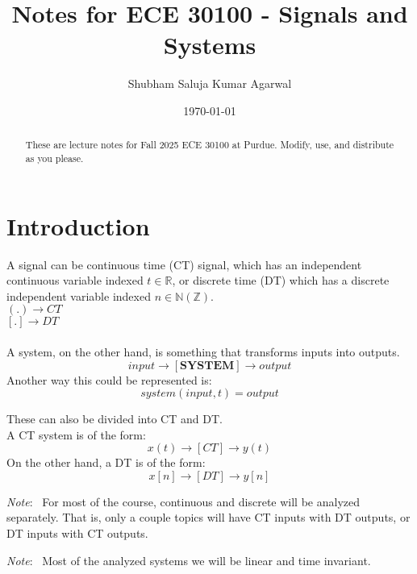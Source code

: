 \documentclass[nobib]{tufte-handout}
\title{Notes for ECE 30100 - Signals and Systems}
\author[Shubham Saluja Kumar Agarwal]{Shubham Saluja Kumar Agarwal}
\date{\today}  %
\newcommand{\note}[1]{
        \begin{notebox}
        \noindent\textit{Note}:\ #1
        \end{notebox}
}
\begin{document}
\maketitle

\begin{abstract}
    These are lecture notes for Fall 2025 ECE 30100 at Purdue. Modify, use, and distribute as you please.
\end{abstract}

\tableofcontents

\newpage

\section{Introduction}
A signal can be continuous time (CT) signal, which has an independent
continuous variable indexed $t\in \mathbb{R}$, or discrete time (DT) which has
a discrete independent variable indexed $n\in \mathbb{N}(\mathbb{Z})$.\\

$(.) \rightarrow CT$ \\
$[.] \rightarrow DT$\\~\\

A system, on the other hand, is something that transforms inputs into outputs.
\begin{equation*}
    input \rightarrow [\mathbf{SYSTEM}] \rightarrow output
\end{equation*}
Another way this could be represented is:
\begin{equation*}
    system(input,t) = output
\end{equation*}

These can also be divided into CT and DT.\\ A CT system is of the form:
\begin{equation*}
    x(t) \rightarrow [CT] \rightarrow y(t)
\end{equation*}
On the other hand, a DT is of the form:
\begin{equation*}
    x[n] \rightarrow [DT] \rightarrow y[n]
\end{equation*}
\note{ For most of the course, continuous and discrete will be analyzed separately. That is, only a couple topics will have CT inputs with DT outputs, or DT inputs with CT outputs.}
\note{ Most of the analyzed systems we will be linear and time invariant.}
\end{document}
